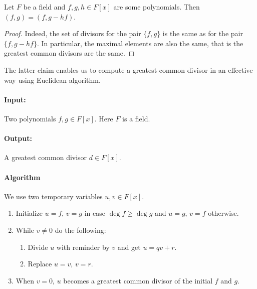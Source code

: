 
\begin{claim}
Let $F$ be a field and $f, g, h\in F[x]$ are some polynomials.
 Then $(f, g) = (f, g - hf)$.
\end{claim}
\begin{proof}
Indeed, the set of divisors for the pair $\{f, g\}$ is the same as for the pair $\{f, g-hf\}$.
In particular, the maximal elements are also the same, that is the greatest common divisors are the same.
\end{proof}

The latter claim enables us to compute a greatest common divisor in an effective way using Euclidean algorithm.

\paragraph{Input:}

Two polynomials $f, g\in F[x]$.
Here $F$ is a field.

\paragraph{Output:}

A greatest common divisor $d\in F[x]$.

\paragraph{Algorithm}

We use two temporary variables $u, v\in F[x]$.

\begin{enumerate}
\item Initialize $u = f$, $v = g$ in case $\deg f \geqslant \deg g$ and $u = g$, $v = f$ otherwise.

\item While $v \neq 0$ do the following:
\begin{enumerate}
\item Divide $u$ with reminder by $v$ and get $u = q v + r$.

\item Replace $u = v$, $v = r$.
\end{enumerate}

\item When $v = 0$, $u$ becomes a greatest common divisor of the initial $f$ and $g$.
\end{enumerate}


